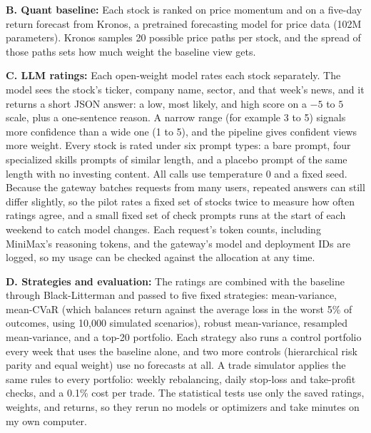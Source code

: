 \documentclass[11pt,letterpaper]{article}
\begin{document}
\textbf{B. Quant baseline:} Each stock is ranked on price momentum and on a five-day return forecast from Kronos, a pretrained forecasting model for price data (102M parameters). Kronos samples 20 possible price paths per stock, and the spread of those paths sets how much weight the baseline view gets.

\textbf{C. LLM ratings:} Each open-weight model rates each stock separately. The model sees the stock's ticker, company name, sector, and that week's news, and it returns a short JSON answer: a low, most likely, and high score on a $-5$ to $5$ scale, plus a one-sentence reason. A narrow range (for example 3 to 5) signals more confidence than a wide one (1 to 5), and the pipeline gives confident views more weight. Every stock is rated under six prompt types: a bare prompt, four specialized skills prompts of similar length, and a placebo prompt of the same length with no investing content. All calls use temperature 0 and a fixed seed. Because the gateway batches requests from many users, repeated answers can still differ slightly, so the pilot rates a fixed set of stocks twice to measure how often ratings agree, and a small fixed set of check prompts runs at the start of each weekend to catch model changes. Each request's token counts, including MiniMax's reasoning tokens, and the gateway's model and deployment IDs are logged, so my usage can be checked against the allocation at any time.

\textbf{D. Strategies and evaluation:} The ratings are combined with the baseline through Black-Litterman and passed to five fixed strategies: mean-variance, mean-CVaR (which balances return against the average loss in the worst 5\% of outcomes, using 10,000 simulated scenarios), robust mean-variance, resampled mean-variance, and a top-20 portfolio. Each strategy also runs a control portfolio every week that uses the baseline alone, and two more controls (hierarchical risk parity and equal weight) use no forecasts at all. A trade simulator applies the same rules to every portfolio: weekly rebalancing, daily stop-loss and take-profit checks, and a 0.1\% cost per trade. The statistical tests use only the saved ratings, weights, and returns, so they rerun no models or optimizers and take minutes on my own computer.
\end{document}
